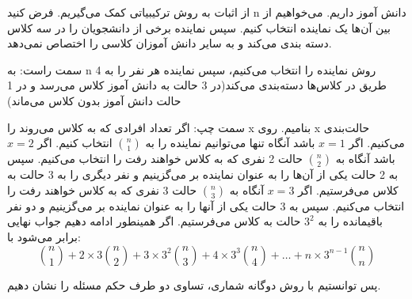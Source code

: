 \p
از اثبات به روش ترکیبیاتی کمک می‌گیریم.
فرض کنید n دانش آموز داریم. می‌خواهیم از بین آن‌ها یک نماینده انتخاب کنیم. سپس نماینده برخی از دانشجویان را در سه کلاس دسته بندی می‌کند و به سایر دانش آموزان کلاسی را اختصاص نمی‌دهد.

\p
سمت راست: به n روش نماینده را انتخاب می‌کنیم، سپس نماینده هر نفر را به 4 طریق در کلاس‌ها دسته‌بندی می‌کند(در 3 حالت به دانش آموز کلاس می‌رسد و در 1 حالت دانش آموز بدون کلاس می‌ماند)

\p
سمت چپ: اگر تعداد افرادی که به کلاس می‌روند را x بنامیم. روی x حالت‌بندی می‌کنیم.
اگر $x = 1$ باشد
آنگاه تنها می‌توانیم نماینده را به 
$\binom{n}{1}$
انتخاب کنیم. اگر $x = 2$ باشد آنگاه به
$\binom{n}{2}$
حالت 2 نفری که به کلاس خواهند رفت را انتخاب می‌کنیم. سپس به 2 حالت یکی از آن‌ها را به عنوان نماینده بر می‌گزینیم و نفر دیگری را به 3 حالت به کلاس می‌فرستیم.
اگر $x = 3$ آنگاه به
$\binom{n}{3}$
حالت 3 نفری که به کلاس خواهند رفت را انتخاب می‌کنیم. سپس به 3 حالت یکی از آنها را به عنوان نماینده بر می‌گزینیم و دو نفر باقیمانده را به 
$3^2$
حالت به کلاس می‌فرستیم.
اگر همینطور ادامه دهیم جواب نهایی برابر می‌شود با:
$$\binom{n}{1} + 2\times3\binom{n}{2} + 3\times3^2\binom{n}{3} + 4\times3^3\binom{n}{4} +\ldots +
n\times3^{n-1}\binom{n}{n}$$

\p
پس توانستیم با روش دوگانه شماری، تساوی دو طرف حکم مسئله را نشان دهیم.